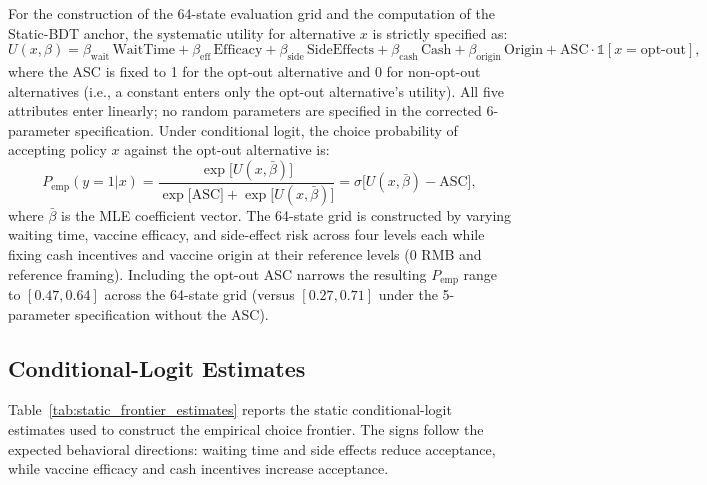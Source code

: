 \documentclass[11pt]{article}
\begin{document}
For the construction of the 64-state evaluation grid and the computation of the Static-BDT anchor, the systematic utility for alternative $x$ is strictly specified as:
\[
U(x, \beta) = \beta_{\text{wait}}\,\text{WaitTime} + \beta_{\text{eff}}\,\text{Efficacy} + \beta_{\text{side}}\,\text{SideEffects} + \beta_{\text{cash}}\,\text{Cash} + \beta_{\text{origin}}\,\text{Origin} + \text{ASC}\cdot\mathbb{1}[x = \text{opt-out}],
\]
where the ASC is fixed to 1 for the opt-out alternative and 0 for non-opt-out alternatives (i.e., a constant enters only the opt-out alternative's utility). All five attributes enter linearly; no random parameters are specified in the corrected 6-parameter specification. Under conditional logit, the choice probability of accepting policy $x$ against the opt-out alternative is:
\[
P_{\mathrm{emp}}(y=1|x) = \frac{\exp\bigl[U(x, \bar\beta)\bigr]}{\exp\bigl[\mathrm{ASC}\bigr] + \exp\bigl[U(x, \bar\beta)\bigr]} = \sigma\bigl[U(x, \bar\beta) - \mathrm{ASC}\bigr],
\]
where $\bar\beta$ is the MLE coefficient vector. The 64-state grid is constructed by varying waiting time, vaccine efficacy, and side-effect risk across four levels each while fixing cash incentives and vaccine origin at their reference levels (0 RMB and reference framing). Including the opt-out ASC narrows the resulting $P_{\mathrm{emp}}$ range to $[0.47, 0.64]$ across the 64-state grid (versus $[0.27, 0.71]$ under the 5-parameter specification without the ASC).

\subsection{Conditional-Logit Estimates}

Table~\ref{tab:static_frontier_estimates} reports the static conditional-logit estimates used to construct the empirical choice frontier. The signs follow the expected behavioral directions: waiting time and side effects reduce acceptance, while vaccine efficacy and cash incentives increase acceptance.
\end{document}
